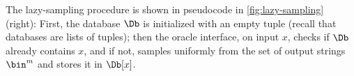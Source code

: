     The lazy-sampling procedure is shown in pseudocode in
      \cref{fig:lazy-sampling} (right): First, the database $\Db$ is initialized
      with an empty tuple (recall that databases are lists of tuples); then the
      oracle interface, on input $x$, checks if $\Db$ already contains $x$, and
      if not, samples uniformly from the set of output strings $\bin^m$ and
      stores it in $\Db[x]$.
